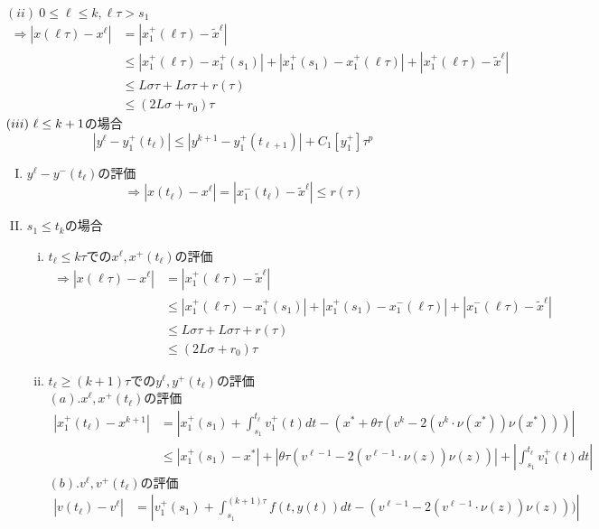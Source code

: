 \documentclass[a4,12pt]{article}
\begin{document}
$(ii)\ 0\le\ell\le k,\ell\tau>s_1$
\[\begin{split}
    \Rightarrow|x(\ell\tau)-x^\ell|&=|x^{+}_1(\ell\tau)-\tilde{x}^\ell|\\
                        &\le|x^{+}_1(\ell\tau)-x^{+}_1(s_1)|+|x^{+}_1(s_1)-x^{+}_1(\ell\tau)|+|x^{+}_1(\ell\tau)-\tilde{x}^\ell|\\
                        &\le L\sigma\tau+L\sigma\tau+r(\tau)\\
                        &\le (2L\sigma+r_0)\tau
\end{split}\]
$\\(iii)\ \ell\le k+1$の場合
\[|y^\ell - y^{+}_1(t_\ell)|\le|y^{k+1}-y^+_1(t_{\ell+1})|+C_1[y^+_1]\tau^p\]
\newpage
\begin{enumerate}[(I).]
    \item$y^\ell-y^{-}(t_\ell)$の評価
    \[\Rightarrow|x(t_\ell)-x^\ell|=|x^{-}_1(t_\ell)-\tilde{x}^\ell|\le r(\tau)\]
    \item$s_1\le t_k$の場合
    \begin{enumerate}[(i).]
        \item$t_\ell\le k\tau$での$x^\ell,x^+(t_\ell)$の評価
        \begin{align*}
            \Rightarrow|x(\ell\tau)-x^\ell|&=|x^{+}_1(\ell\tau)-\tilde{x}^\ell|\\
                                &\le|x^{+}_1(\ell\tau)-x^{+}_1(s_1)|+|x^{+}_1(s_1)-x^{-}_1(\ell\tau)|+|x^{-}_1(\ell\tau)-\tilde{x}^\ell|\\
                                &\le L\sigma\tau+L\sigma\tau+r(\tau)\\
                                &\le (2L\sigma+r_0)\tau
            \end{align*}
        \item$t_\ell\ge (k+1)\tau$での$y^\ell,y^+(t_\ell)$の評価\\
            $(a).x^\ell,x^+(t_\ell)$の評価
            \begin{align*}
            |x^+_1(t_\ell)-x^{k+1}|&=|x^+_1(s_1)+\int^{t_\ell}_{s_1}v^+_1(t)dt-(x^\ast+\theta\tau(v^{k}-2(v^{k}\cdot\nu(x^\ast))\nu(x^\ast)))|\\
                          &\leq |x^+_1(s_1)-x^\ast|+|\theta\tau(v^{\ell-1}-2(v^{\ell-1}\cdot\nu(z))\nu(z))|+|\int^{t_\ell}_{s_1}v_1^+(t)dt|
            \end{align*}
            $(b).v^\ell,v^+(t_\ell)$の評価
            \begin{align*}
            |v(t_\ell)-v^\ell|&=|v_1^+(s_1)+\int^{(k+1)\tau}_{s_1}f(t,y(t))dt-(v^{\ell-1}-2(v^{\ell-1}\cdot\nu(z))\nu(z)))|\\

\end{align*}
\end{enumerate}
\end{enumerate}
\end{document}
